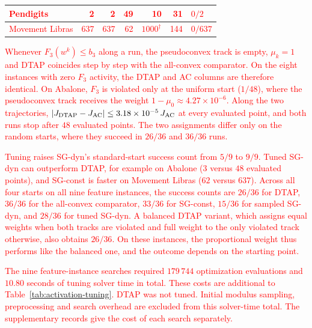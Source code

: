 \documentclass[]{interact}
\theoremstyle{plain}
\theoremstyle{definition}
\theoremstyle{remark}
\begin{document}
\begin{table}[t]
\begin{tabular}{@{}lrrrrrl@{}}
\leavevmode\textcolor{red}{Pendigits}    & \leavevmode\textcolor{red}{2} & \leavevmode\textcolor{red}{2} & \leavevmode\textcolor{red}{49} & \leavevmode\textcolor{red}{10} & \leavevmode\textcolor{red}{31} & \leavevmode\textcolor{red}{$0/2$}\\
\midrule
\leavevmode\textcolor{red}{Movement Libras} & \leavevmode\textcolor{red}{637} & \leavevmode\textcolor{red}{637} & \leavevmode\textcolor{red}{62} & \leavevmode\textcolor{red}{$1000^\dagger$} & \leavevmode\textcolor{red}{144} & \leavevmode\textcolor{red}{$0/637$}\\
\bottomrule
\end{tabular}
\end{table}

\leavevmode\textcolor{red}{Whenever $F_3(w^k)\le b_3$ along a run, the pseudoconvex track is empty, $\mu_k=1$ and DTAP coincides step by step with the all-convex comparator. On the eight instances with zero $F_3$ activity, the DTAP and AC columns are therefore identical. On Abalone, $F_3$ is violated only at the uniform start ($1/48$), where the pseudoconvex track receives the weight $1-\mu_0\approx4.27\times10^{-6}$. Along the two trajectories, $|J_{\rm DTAP}-J_{\rm AC}|\le3.18\times10^{-5}\,J_{\rm AC}$ at every evaluated point, and both runs stop after $48$ evaluated points. The two assignments differ only on the random starts, where they succeed in $26/36$ and $36/36$ runs.}

\leavevmode\textcolor{red}{Tuning raises SG-dyn's standard-start success count from $5/9$ to $9/9$. Tuned SG-dyn can outperform DTAP, for example on Abalone ($3$ versus $48$ evaluated points), and SG-const is faster on Movement Libras ($62$ versus $637$). Across all four starts on all nine feature instances, the success counts are $26/36$ for DTAP, $36/36$ for the all-convex comparator, $33/36$ for SG-const, $15/36$ for sampled SG-dyn, and $28/36$ for tuned SG-dyn. A balanced DTAP variant, which assigns equal weights when both tracks are violated and full weight to the only violated track otherwise, also obtains $26/36$. On these instances, the proportional weight thus performs like the balanced one, and the outcome depends on the starting point.}

\leavevmode\textcolor{red}{The nine feature-instance searches required $179\,744$ optimization evaluations and $10.80$ seconds of tuning solver time in total. These costs are additional to Table~\ref{tab:activation-tuning}. DTAP was not tuned. Initial modulus sampling, preprocessing and search overhead are excluded from this solver-time total. The supplementary records give the cost of each search separately.}
\end{document}
